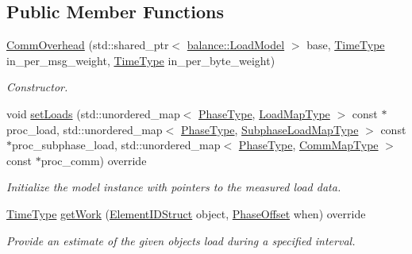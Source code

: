 \subsection*{Public Member Functions}
\begin{DoxyCompactItemize}
\item 
\hyperlink{structvt_1_1vrt_1_1collection_1_1balance_1_1_comm_overhead_af918fee4ae0360d93c19442945e9c3d4}{Comm\+Overhead} (std\+::shared\+\_\+ptr$<$ \hyperlink{classvt_1_1vrt_1_1collection_1_1balance_1_1_load_model}{balance\+::\+Load\+Model} $>$ base, \hyperlink{namespacevt_a876a9d0cd5a952859c72de8a46881442}{Time\+Type} in\+\_\+per\+\_\+msg\+\_\+weight, \hyperlink{namespacevt_a876a9d0cd5a952859c72de8a46881442}{Time\+Type} in\+\_\+per\+\_\+byte\+\_\+weight)
\begin{DoxyCompactList}\small\item\em Constructor. \end{DoxyCompactList}\item 
void \hyperlink{structvt_1_1vrt_1_1collection_1_1balance_1_1_comm_overhead_a4c74d8adf7fa0fbc5e4767397b479305}{set\+Loads} (std\+::unordered\+\_\+map$<$ \hyperlink{namespacevt_a46ce6733d5cdbd735d561b7b4029f6d7}{Phase\+Type}, \hyperlink{namespacevt_1_1vrt_1_1collection_1_1balance_a824290c4323836ba7541a39845a200c3}{Load\+Map\+Type} $>$ const $\ast$proc\+\_\+load, std\+::unordered\+\_\+map$<$ \hyperlink{namespacevt_a46ce6733d5cdbd735d561b7b4029f6d7}{Phase\+Type}, \hyperlink{namespacevt_1_1vrt_1_1collection_1_1balance_a8bdadb2583f128dd256e7d5a10826542}{Subphase\+Load\+Map\+Type} $>$ const $\ast$proc\+\_\+subphase\+\_\+load, std\+::unordered\+\_\+map$<$ \hyperlink{namespacevt_a46ce6733d5cdbd735d561b7b4029f6d7}{Phase\+Type}, \hyperlink{namespacevt_1_1vrt_1_1collection_1_1balance_a10860c956804d644db54a16012352728}{Comm\+Map\+Type} $>$ const $\ast$proc\+\_\+comm) override
\begin{DoxyCompactList}\small\item\em Initialize the model instance with pointers to the measured load data. \end{DoxyCompactList}\item 
\hyperlink{namespacevt_a876a9d0cd5a952859c72de8a46881442}{Time\+Type} \hyperlink{structvt_1_1vrt_1_1collection_1_1balance_1_1_comm_overhead_a16fbdbf4ab0e682ea391c820aac530a9}{get\+Work} (\hyperlink{structvt_1_1vrt_1_1collection_1_1balance_1_1_element_i_d_struct}{Element\+I\+D\+Struct} object, \hyperlink{structvt_1_1vrt_1_1collection_1_1balance_1_1_phase_offset}{Phase\+Offset} when) override
\begin{DoxyCompactList}\small\item\em Provide an estimate of the given object\textquotesingle{}s load during a specified interval. \end{DoxyCompactList}\end{DoxyCompactItemize}
